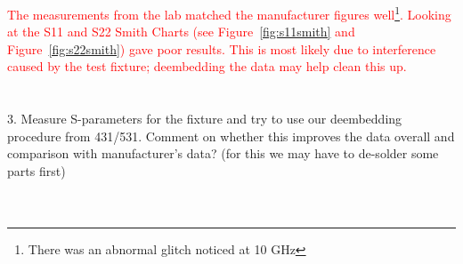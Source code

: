 \documentclass[conference]{IEEEtran}
\begin{document}
\textcolor{red}{The measurements from the lab matched the manufacturer figures well\footnote{There was an abnormal glitch noticed at 10 GHz}.  Looking at the S11 and S22 Smith Charts (see Figure~\ref{fig:s11smith} and Figure~\ref{fig:s22smith}) gave poor results.  This is most likely due to interference caused by the test fixture; deembedding the data may help clean this up.}\\\\\\
3. Measure S-parameters for the fixture and try to use our deembedding procedure from 431/531. Comment on whether this improves the data overall and comparison with manufacturer's data? (for this we may have to de-solder some parts first)\\\\\\
\end{document}
